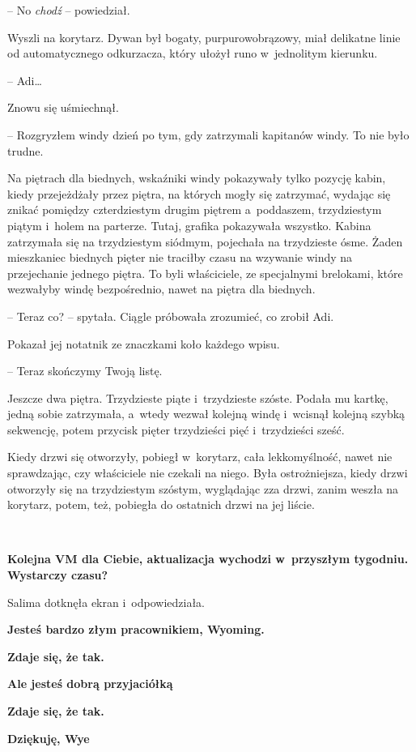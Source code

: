 \documentclass[oneside,polish,11pt,sfheadings]{mwbk}
\begin{document}
-- No \textit{chodź} -- powiedział.

Wyszli na korytarz. Dywan był bogaty, purpurowobrązowy, miał delikatne
linie od automatycznego odkurzacza, który ułożył runo w~jednolitym
kierunku.

-- Adi\ldots 

Znowu się uśmiechnął. 

-- Rozgryzłem windy dzień po tym, gdy zatrzymali
kapitanów windy. To nie było trudne.

Na piętrach dla biednych, wskaźniki windy pokazywały tylko pozycję
kabin, kiedy przejeżdżały przez piętra, na których mogły się zatrzymać,
wydając się znikać pomiędzy czterdziestym drugim piętrem a~poddaszem,
trzydziestym piątym i~holem na parterze. Tutaj, grafika pokazywała
wszystko. Kabina zatrzymała się na trzydziestym siódmym, pojechała na
trzydzieste ósme. Żaden mieszkaniec biednych pięter nie traciłby czasu
na wzywanie windy na przejechanie jednego piętra. To byli właściciele,
ze specjalnymi brelokami, które wezwałyby windę bezpośrednio, nawet na
piętra dla biednych.

-- Teraz co? -- spytała. Ciągle próbowała zrozumieć, co zrobił Adi.

Pokazał jej notatnik ze znaczkami koło każdego wpisu. 

-- Teraz skończymy
Twoją listę.

Jeszcze dwa piętra. Trzydzieste piąte i~trzydzieste szóste. Podała mu
kartkę, jedną sobie zatrzymała, a~wtedy wezwał kolejną windę i~wcisnął
kolejną szybką sekwencję, potem przycisk pięter trzydzieści pięć i~trzydzieści sześć.

Kiedy drzwi się otworzyły, pobiegł w~korytarz, cała lekkomyślność, nawet
nie sprawdzając, czy właściciele nie czekali na niego. Była
ostrożniejsza, kiedy drzwi otworzyły się na trzydziestym szóstym,
wyglądając zza drzwi, zanim weszła na korytarz, potem, też, pobiegła do
ostatnich drzwi na jej liście.

~

\textbf{ Kolejna VM dla Ciebie, aktualizacja wychodzi w~przyszłym tygodniu. Wystarczy czasu?}

Salima dotknęła ekran i~odpowiedziała.

\textbf{ Jesteś bardzo złym pracownikiem, Wyoming.}

\textbf{ Zdaje się, że tak.}

\textbf{ Ale jesteś dobrą przyjaciółką}

\textbf{ Zdaje się, że tak.}

\textbf{ Dziękuję, Wye}
\end{document}
